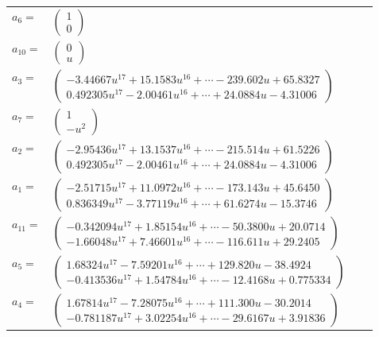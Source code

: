 \documentclass[1p]{elsarticle_modified}
\theoremstyle{definition}
\begin{document}
\begin{tabular}{m{7pt} m{180pt} m{7pt} m{180pt} }
\flushright $a_{6}=$&$\begin{pmatrix}1\\0\end{pmatrix}$ \\
\flushright $a_{10}=$&$\begin{pmatrix}0\\u\end{pmatrix}$ \\
\flushright $a_{3}=$&$\begin{pmatrix}-3.44667 u^{17}+15.1583 u^{16}+\cdots-239.602 u+65.8327\\0.492305 u^{17}-2.00461 u^{16}+\cdots+24.0884 u-4.31006\end{pmatrix}$ \\
\flushright $a_{7}=$&$\begin{pmatrix}1\\- u^2\end{pmatrix}$ \\
\flushright $a_{2}=$&$\begin{pmatrix}-2.95436 u^{17}+13.1537 u^{16}+\cdots-215.514 u+61.5226\\0.492305 u^{17}-2.00461 u^{16}+\cdots+24.0884 u-4.31006\end{pmatrix}$ \\
\flushright $a_{1}=$&$\begin{pmatrix}-2.51715 u^{17}+11.0972 u^{16}+\cdots-173.143 u+45.6450\\0.836349 u^{17}-3.77119 u^{16}+\cdots+61.6274 u-15.3746\end{pmatrix}$ \\
\flushright $a_{11}=$&$\begin{pmatrix}-0.342094 u^{17}+1.85154 u^{16}+\cdots-50.3800 u+20.0714\\-1.66048 u^{17}+7.46601 u^{16}+\cdots-116.611 u+29.2405\end{pmatrix}$ \\
\flushright $a_{5}=$&$\begin{pmatrix}1.68324 u^{17}-7.59201 u^{16}+\cdots+129.820 u-38.4924\\-0.413536 u^{17}+1.54784 u^{16}+\cdots-12.4168 u+0.775334\end{pmatrix}$ \\
\flushright $a_{4}=$&$\begin{pmatrix}1.67814 u^{17}-7.28075 u^{16}+\cdots+111.300 u-30.2014\\-0.781187 u^{17}+3.02254 u^{16}+\cdots-29.6167 u+3.91836\end{pmatrix}$ \\

\end{tabular}
\end{document}

